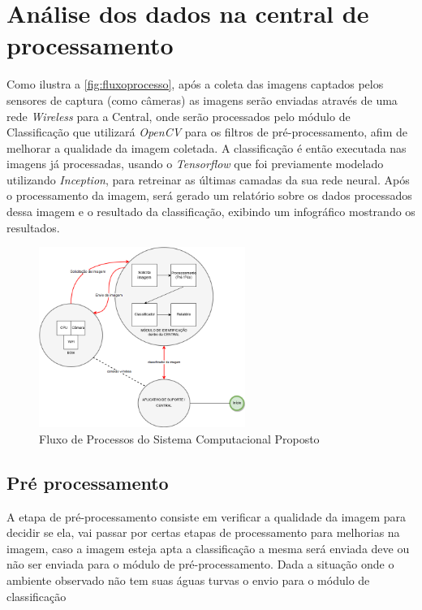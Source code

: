 \section{Análise dos dados na central de processamento}

Como ilustra a \autoref{fig:fluxoprocesso}, após a coleta das imagens captados pelos sensores de captura (como câmeras) as imagens serão enviadas através de uma rede \textit{Wireless} para a Central, onde serão processados pelo módulo de Classificação que utilizará \textit{OpenCV} \cite{opencv} para os filtros de pré-processamento, afim de melhorar a qualidade da imagem coletada. A classificação é então executada nas imagens já processadas, usando o \textit{Tensorflow} que foi previamente modelado utilizando \textit{Inception}, para retreinar as últimas camadas da sua rede neural. 
% 
Após o processamento da imagem, será gerado um relatório sobre os dados processados dessa imagem e o resultado da classificação, exibindo um infográfico mostrando os resultados.

\begin{figure}[htbp]
	\centering
    \caption{\label{fig:fluxoprocesso}Fluxo de Processos do Sistema Computacional Proposto}
	\includegraphics[width = 0.6\textwidth]{resources/fluxo-de-processo.png}
\end{figure}

\subsection{Pré processamento}
A etapa de pré-processamento consiste em verificar a qualidade da imagem para decidir se ela, vai passar por certas etapas de processamento para melhorias na imagem, caso a imagem esteja apta a classificação a mesma será enviada  deve ou não ser enviada para o módulo de pré-processamento. Dada a situação onde o ambiente observado não tem suas águas turvas o envio para o módulo de classificação


